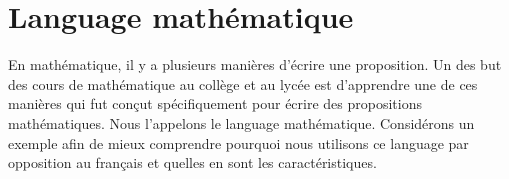 \begin{comment}
	\begin{table}[H]
		\centering
		\begin{tabular}{|c|c|c|}
		\hline
		\textbf{Préfixe} & \textbf{Symbole} & \textbf{Forme exponentielle} \\ \hline
		exa & E & $10^{18}$ \\ \hline
		peta & P & $10^{15}$ \\ \hline
		tera & T & $10^{12}$ \\ \hline
		giga & G & $10^{9}$ \\ \hline
		mega & M & $10^{6}$ \\ \hline
		kilo & k & $10^{3}$ \\ \hline
		hecto & h & $10^{2}$ \\ \hline
		deca & da & $10^{1}$ \\ \hline
		--- & --- & $10^{0} = 1$ \\ \hline
		deci & d & $10^{-1}$ \\ \hline
		centi & c & $10^{-2}$ \\ \hline
		milli & m & $10^{-3}$ \\ \hline
		micro & $\mu$ & $10^{-6}$ \\ \hline
		nano & n & $10^{-9}$ \\ \hline
		pico & p & $10^{-12}$ \\ \hline
		femto & f & $10^{-15}$ \\ \hline
		atto & a & $10^{-18}$ \\ \hline
		\end{tabular}
	\end{table}
\end{comment}

\section{Language mathématique}

En mathématique, il y a plusieurs manières d'écrire une proposition. Un des but des cours de mathématique au collège et au lycée est d'apprendre une de ces manières qui fut conçut spécifiquement pour écrire des propositions mathématiques. Nous l'appelons le language mathématique. Considérons un exemple afin de mieux comprendre pourquoi nous utilisons ce language par opposition au français et quelles en sont les caractéristiques.

